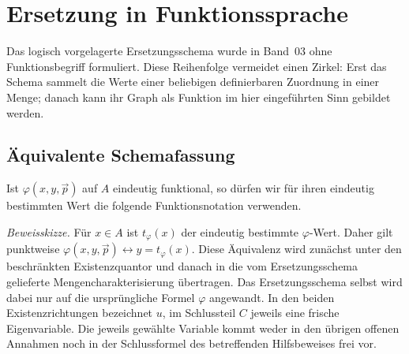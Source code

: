 \documentclass[main.tex]{subfiles}
\begin{document}
\begin{tabproof}
\end{tabproof}


\section{Ersetzung in Funktionssprache}

Das logisch vorgelagerte Ersetzungsschema wurde in Band~03 ohne
Funktionsbegriff formuliert. Diese Reihenfolge vermeidet einen Zirkel: Erst
das Schema sammelt die Werte einer beliebigen definierbaren Zuordnung in
einer Menge; danach kann ihr Graph als Funktion im hier eingeführten Sinn
gebildet werden.

\subsection{Äquivalente Schemafassung}

Ist \(\varphi(x,y,\vec p)\) auf \(A\) eindeutig funktional, so dürfen wir für
ihren eindeutig bestimmten Wert die folgende Funktionsnotation verwenden.



\emph{Beweisskizze.}
Für \(x\in A\) ist \(t_{\varphi}(x)\) der eindeutig bestimmte
\(\varphi\)-Wert. Daher gilt punktweise
\(\varphi(x,y,\vec p)\leftrightarrow y=t_{\varphi}(x)\).
Diese Äquivalenz wird zunächst unter den beschränkten Existenzquantor
und danach in die vom Ersetzungsschema gelieferte Mengencharakterisierung
übertragen. Das Ersetzungsschema selbst wird dabei nur auf die ursprüngliche
Formel \(\varphi\) angewandt.
In den beiden Existenzrichtungen bezeichnet \(u\), im Schlussteil \(C\)
jeweils eine frische Eigenvariable. Die jeweils gewählte Variable kommt weder
in den übrigen offenen Annahmen noch in der Schlussformel des betreffenden
Hilfsbeweises frei vor.
\end{document}
